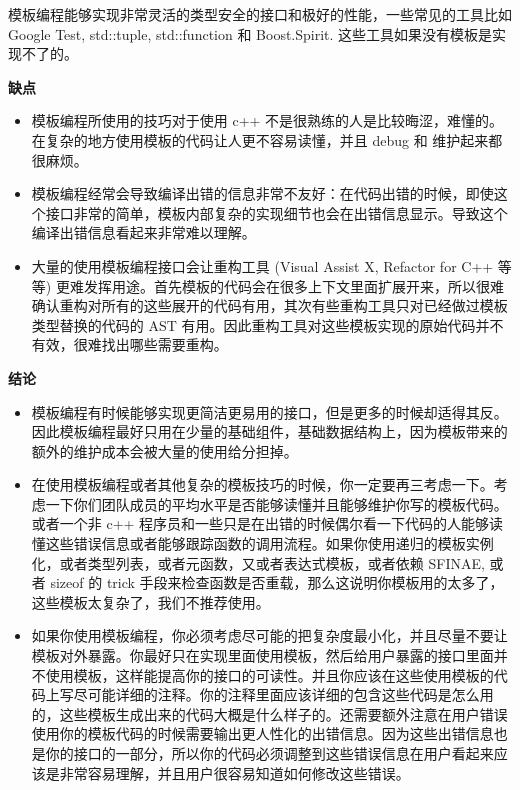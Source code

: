 模板编程能够实现非常灵活的类型安全的接口和极好的性能，一些常见的工具比如 Google Test, std::tuple, std::function 和 Boost.Spirit. 这些工具如果没有模板是实现不了的。

\textbf{缺点}

\begin{itemize}
  \item 模板编程所使用的技巧对于使用 c++ 不是很熟练的人是比较晦涩，难懂的。在复杂的地方使用模板的代码让人更不容易读懂，并且 debug 和 维护起来都很麻烦。
  \item 模板编程经常会导致编译出错的信息非常不友好：在代码出错的时候，即使这个接口非常的简单，模板内部复杂的实现细节也会在出错信息显示。导致这个编译出错信息看起来非常难以理解。
  \item 大量的使用模板编程接口会让重构工具 (Visual Assist X, Refactor for C++ 等等) 更难发挥用途。首先模板的代码会在很多上下文里面扩展开来，所以很难确认重构对所有的这些展开的代码有用，其次有些重构工具只对已经做过模板类型替换的代码的 AST 有用。因此重构工具对这些模板实现的原始代码并不有效，很难找出哪些需要重构。
\end{itemize}

\textbf{结论}

\begin{itemize}
  \item 模板编程有时候能够实现更简洁更易用的接口，但是更多的时候却适得其反。因此模板编程最好只用在少量的基础组件，基础数据结构上，因为模板带来的额外的维护成本会被大量的使用给分担掉。
  \item 在使用模板编程或者其他复杂的模板技巧的时候，你一定要再三考虑一下。考虑一下你们团队成员的平均水平是否能够读懂并且能够维护你写的模板代码。或者一个非 c++ 程序员和一些只是在出错的时候偶尔看一下代码的人能够读懂这些错误信息或者能够跟踪函数的调用流程。如果你使用递归的模板实例化，或者类型列表，或者元函数，又或者表达式模板，或者依赖 SFINAE, 或者 sizeof 的 trick 手段来检查函数是否重载，那么这说明你模板用的太多了，这些模板太复杂了，我们不推荐使用。
  \item 如果你使用模板编程，你必须考虑尽可能的把复杂度最小化，并且尽量不要让模板对外暴露。你最好只在实现里面使用模板，然后给用户暴露的接口里面并不使用模板，这样能提高你的接口的可读性。并且你应该在这些使用模板的代码上写尽可能详细的注释。你的注释里面应该详细的包含这些代码是怎么用的，这些模板生成出来的代码大概是什么样子的。还需要额外注意在用户错误使用你的模板代码的时候需要输出更人性化的出错信息。因为这些出错信息也是你的接口的一部分，所以你的代码必须调整到这些错误信息在用户看起来应该是非常容易理解，并且用户很容易知道如何修改这些错误。
\end{itemize}

